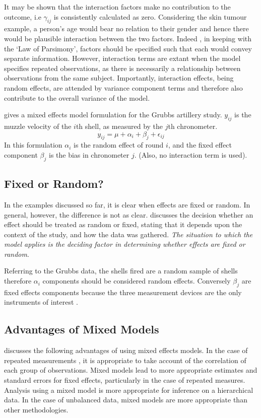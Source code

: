 \documentclass[12pt, a4paper]{report}
\begin{document}
It may be shown that the interaction factors make no contribution
to the outcome, i.e $\gamma_{ij}$ is consistently calculated as
zero. Considering the skin tumour example, a person's age would
bear no relation to their gender and hence there would be
plausible interaction between the two factors. Indeed , in keeping
with the `Law of Parsimony', factors should be specified such that
each would convey separate information. However, interaction terms
are extant when the model specifies repeated observations, as
there is necessarily a relationship between observations from the
same subject. Importantly, interaction effects, being random
effects, are attended by variance component terms and therefore
also contribute to the overall variance of the model.

\citet{Searle} gives a mixed effects model formulation for the
Grubbs artillery study. $y_{ij}$ is the muzzle velocity of the
$i$th shell, as measured by the $j$th chronometer.
\begin{equation}
y_{ij} = \mu + \alpha_{i} + \beta_{j}  + \epsilon_{ij}
\end{equation}
In this formulation $\alpha_{i}$ is the random effect of round
$i$, and the fixed effect component $\beta_{j}$ is the bias in
chronometer $j$. (Also, no interaction term is used).

\subsection{Fixed or Random?}

In the examples discussed so far, it is clear when effects are
fixed or random. In general, however, the difference is not as
clear. \citet{Searle} discusses the decision whether an effect
should be treated as random or fixed, stating that it depends upon
the context of the study, and how the data was gathered. \emph{The
situation to which the model applies is the deciding factor in
determining whether effects are fixed or random}.

Referring to the Grubbs data, the shells fired are a random sample
of shells therefore $\alpha_{i}$ components should be considered
random effects. Conversely $\beta_{j}$ are fixed effects
components because the three measurement devices are the only
instruments of interest \citep{Searle}.


\subsection{Advantages of Mixed Models}
\citet{BrownPrescott} discusses the  following advantages of using
mixed effects models. In the case of repeated measurements , it is
appropriate to take account of the correlation of each group of
observations. Mixed models lead to more appropriate estimates and
standard errors for fixed effects, particularly in the case of
repeated measures. Analysis using a mixed model is more
appropriate for inference on a hierarchical data. In the case of
unbalanced data, mixed models are more appropriate than other
methodologies.
\end{document}
